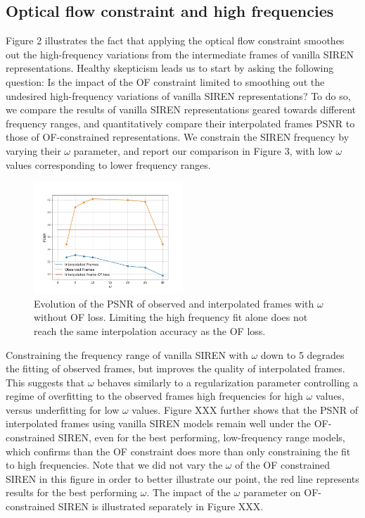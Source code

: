 \documentclass{article}
\begin{document}
\subsection{Optical flow constraint and high frequencies}

Figure 2 illustrates the fact that applying the optical flow constraint smoothes
out the high-frequency variations from the intermediate frames of vanilla SIREN representations.
Healthy skepticism leads us to start by asking the following question:
Is the impact of the OF constraint limited to smoothing out the undesired high-frequency variations of vanilla SIREN representations?
To do so, we compare the results of vanilla SIREN representations geared towards different frequency ranges,
and quantitatively compare their interpolated frames PSNR to those of OF-constrained representations.
We constrain the SIREN frequency by varying their $\omega$ parameter, and report our comparison in Figure 3,
with low $\omega$ values corresponding to lower frequency ranges.

\begin{figure}[t]
\centering
\includegraphics[width=0.5\textwidth]{"omega_wo_of"}
\caption{Evolution of the PSNR of observed and interpolated frames with $\omega$ without OF loss.
Limiting the high frequency fit alone does not reach the same interpolation accuracy as the OF loss.}
\end{figure}

Constraining the frequency range of vanilla SIREN with $\omega$ down to 5 degrades the fitting of observed frames,
but improves the quality of interpolated frames.
This suggests that $\omega$ behaves similarly to a regularization parameter
controlling a regime of overfitting to the observed frames high frequencies for high $\omega$ values,
versus underfitting for low $\omega$ values.
Figure XXX further shows that the PSNR of interpolated frames using vanilla SIREN models remain well under the OF-constrained SIREN,
even for the best performing, low-frequency range models,
which confirms than the OF constraint does more than only constraining the fit to high frequencies.
Note that we did not vary the $\omega$ of the OF constrained SIREN in this figure in order to better illustrate our point,
the red line represents results for the best performing $\omega$.
The impact of the $\omega$ parameter on OF-constrained SIREN is illustrated separately in Figure XXX.
\end{document}
